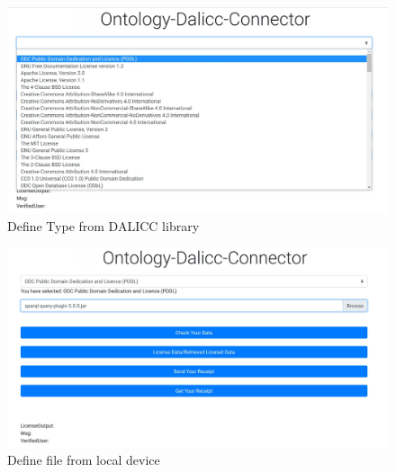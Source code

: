 \begin{center}
	\begin{figure}[htb!]
		
		\begin{minipage}{0.55\linewidth}
			\centering
			\includegraphics[width=1.95\textwidth]{images/chap03_selectType.jpg}
		\end{minipage}
		\caption[Define Type from DALICC library]{Define Type from DALICC library}
		
	\end{figure}
	
\end{center}
\begin{center}
	\begin{figure}[htb!]
		
		\begin{minipage}{0.55\linewidth}
			\centering
			\includegraphics[width=1.95\textwidth]{images/chap03_selectFile.jpg}
		\end{minipage}
		\caption[Define file from local device]{Define file from local device}
		
	\end{figure}
	
\end{center}
